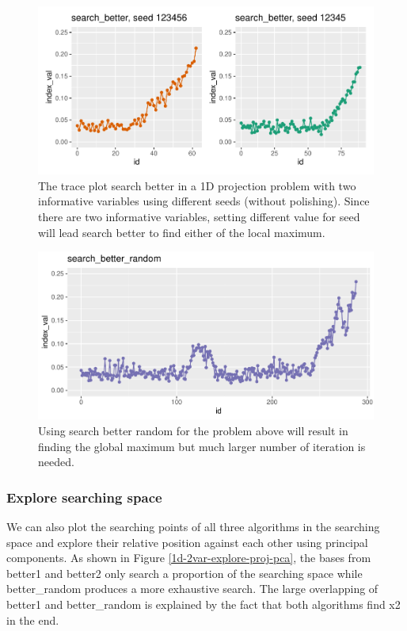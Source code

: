 \documentclass[12pt]{article}
\begin{document}
\begin{figure}
\centering
\includegraphics{paper_files/figure-latex/1d-2var-different-seeds-1.pdf}
\caption{\label{1d-2var-different-seeds}The trace plot search better in
a 1D projection problem with two informative variables using different
seeds (without polishing). Since there are two informative variables,
setting different value for seed will lead search better to find either
of the local maximum.}
\end{figure}

\begin{figure}
\centering
\includegraphics{paper_files/figure-latex/1d-2var-better-random-1.pdf}
\caption{\label{1d-2var-better-random}Using search better random for the
problem above will result in finding the global maximum but much larger
number of iteration is needed.}
\end{figure}

\hypertarget{explore-searching-space}{%
\subsubsection{Explore searching space}\label{explore-searching-space}}

We can also plot the searching points of all three algorithms in the
searching space and explore their relative position against each other
using principal components. As shown in Figure
\ref{1d-2var-explore-proj-pca}, the bases from better1 and better2 only
search a proportion of the searching space while better\_random produces
a more exhaustive search. The large overlapping of better1 and
better\_random is explained by the fact that both algorithms find x2 in
the end.
\end{document}
